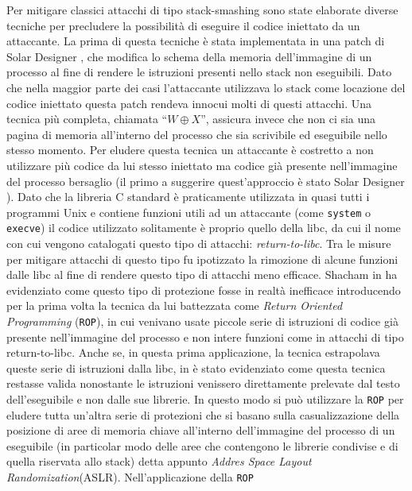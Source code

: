 Per mitigare classici attacchi di tipo stack-smashing sono state
elaborate diverse tecniche per precludere la possibilità di eseguire
il codice iniettato da un attaccante. La prima di questa tecniche è
stata implementata in una patch di Solar Designer \cite{stackpatch},
che modifica lo schema della memoria dell'immagine di un processo al
fine di rendere le istruzioni presenti nello stack non
eseguibili. Dato che nella maggior parte dei casi l'attaccante
utilizzava lo stack come locazione del codice iniettato questa patch
rendeva innocui molti di questi attacchi. Una tecnica più completa,
chiamata ``$W \oplus X$'', assicura invece che non ci sia una pagina
di memoria all'interno del processo che sia scrivibile ed eseguibile
nello stesso momento. Per eludere questa tecnica un attaccante è
costretto a non utilizzare più codice da lui stesso iniettato ma
codice già presente nell'immagine del processo bersaglio (il primo a
suggerire quest'approccio è stato Solar Designer
\cite{solar-return-to-libc}). Dato che la libreria C standard è
praticamente utilizzata in quasi tutti i programmi Unix e contiene
funzioni utili ad un attaccante (come \lstinline{system} o
\lstinline{execve}) il codice utilizzato solitamente è proprio quello
della libc, da cui il nome con cui vengono catalogati questo tipo di
attacchi: \emph{return-to-libc}. Tra le misure per mitigare attacchi
di questo tipo fu ipotizzato la rimozione di alcune funzioni dalle
libc al fine di rendere questo tipo di attacchi meno efficace. Shacham
in \cite{Shacham-2007} ha evidenziato come questo tipo di protezione
fosse in realtà inefficace introducendo per la prima volta la tecnica
da lui battezzata come \emph{Return Oriented Programming}
(\lstinline{ROP}), in cui venivano usate piccole serie di istruzioni
di codice già presente nell'immagine del processo e non intere
funzioni come in attacchi di tipo return-to-libc. Anche se, in questa
prima applicazione, la tecnica estrapolava queste serie di istruzioni
dalla libc, in \cite{schwartz-2011} è stato evidenziato come questa
tecnica restasse valida nonostante le istruzioni venissero
direttamente prelevate dal testo dell'eseguibile e non dalle sue
librerie. In questo modo si può utilizzare la \lstinline{ROP} per
eludere tutta un'altra serie di protezioni che si basano sulla
casualizzazione della posizione di aree di memoria chiave all'interno
dell'immagine del processo di un eseguibile (in particolar modo delle
aree che contengono le librerie condivise e di quella riservata allo
stack) detta appunto \emph{Addres Space Layout
  Randomization}(ASLR). Nell'applicazione della \lstinline{ROP}

